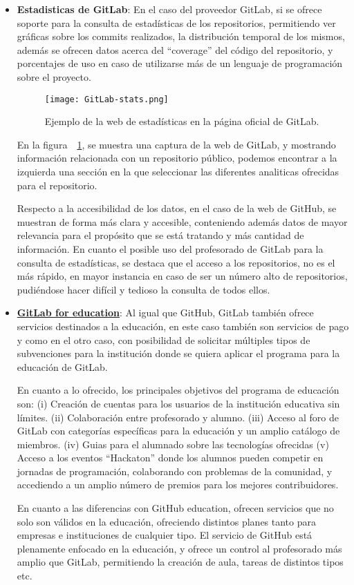 \begin{itemize}
	
	\item \textbf{Estadisticas de GitLab}: En el caso del proveedor GitLab, si se ofrece soporte para la consulta de estadísticas de los repositorios, permitiendo ver gráficas sobre los commits realizados, la distribución temporal de los mismos, además se ofrecen datos acerca del “coverage” del código del repositorio, y porcentajes de uso en caso de utilizarse más de un lenguaje de programación sobre el proyecto.

		\begin{figure}[h!]
			\centerline{\texttt{[image: GitLab-stats.png]}}
			\caption{Ejemplo de la web de estadísticas en la página oficial de GitLab.}
			\label{figure:GitLabInsights}
		\end{figure}

		En la figura~~\ref{figure:GitLabInsights}, se muestra una captura de la web de GitLab, y mostrando información relacionada con un repositorio público, podemos encontrar a la izquierda una sección en la que seleccionar las diferentes analiticas ofrecidas para el repositorio.
		
		Respecto a la accesibilidad de los datos, en el caso de la web de GitHub, se muestran de forma más clara y accesible, conteniendo además datos de mayor relevancia para el propósito que se está tratando y más cantidad de información. En cuanto el posible uso del profesorado de GitLab para la consulta de estadísticas, se destaca que el acceso a los repositorios, no es el más rápido, en mayor instancia en caso de ser un número alto de repositorios, pudiéndose hacer difícil y tedioso la consulta de todos ellos.
		
	\item \textbf{\href{https://about.gitlab.com/solutions/education/}{GitLab for education}}: Al igual que GitHub, GitLab también ofrece servicios destinados a la educación, en este caso también son servicios  de pago y como en el otro caso, con posibilidad de solicitar múltiples tipos de subvenciones para la institución donde se quiera aplicar el programa para la educación de GitLab. 

		En cuanto a lo ofrecido, los principales objetivos del programa de educación son:
		(i) Creación de cuentas para los usuarios de la institución educativa sin límites. (ii) Colaboración entre profesorado y alumno. (iii) Acceso al foro de GitLab con categorías específicas para la educación y un amplio catálogo de miembros. (iv) Guias para el alumnado sobre las tecnologías ofrecidas (v) Acceso a los eventos “Hackaton” donde los alumnos pueden competir en jornadas de programación, colaborando con problemas de la comunidad, y accediendo a un amplio número de premios para los mejores contribuidores.
		
		
		En cuanto a las diferencias con GitHub education, ofrecen servicios que no solo son válidos en la educación, ofreciendo distintos planes tanto para empresas e instituciones de cualquier tipo. El servicio de GitHub está plenamente enfocado en la educación, y ofrece un control al profesorado más amplio que GitLab, permitiendo la creación de aula, tareas de distintos tipos etc.
		
	\end{itemize}
